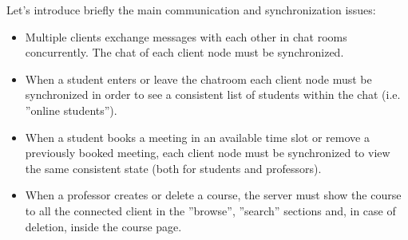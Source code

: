 Let's introduce briefly the main communication and synchronization issues:
\begin{itemize}
    \item Multiple clients exchange messages with each other in chat rooms concurrently. The chat of each client node must be synchronized.
    \item When a student enters or leave the chatroom each client node must be synchronized in order to see a consistent list of students within the chat (i.e. ”online students”).
    \item When a student books a meeting in an available time slot or remove a previously booked meeting, each client node must be synchronized to view the same consistent state (both for students and professors).
    \item When a professor creates or delete a course, the server must show the course to all the connected client in the ”browse”, ”search” sections and, in case of deletion, inside the course page.
\end{itemize}